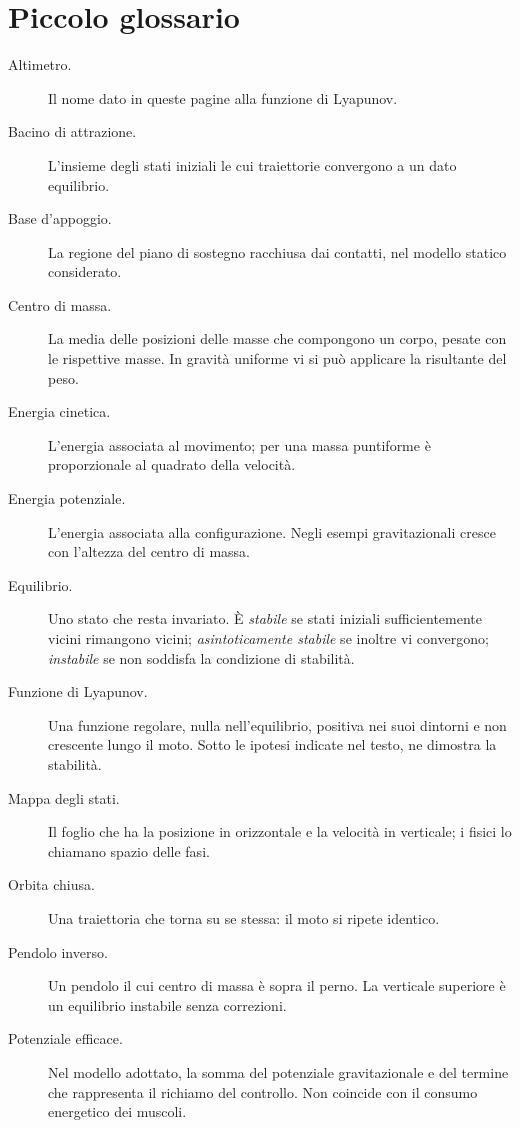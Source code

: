 \documentclass[11pt]{article}
\begin{document}
\section*{Piccolo glossario}

{\small
\begin{description}
\item[Altimetro.] Il nome dato in queste pagine alla funzione di Lyapunov.
\item[Bacino di attrazione.] L'insieme degli stati iniziali le cui traiettorie convergono a un dato equilibrio.
\item[Base d'appoggio.] La regione del piano di sostegno racchiusa dai contatti, nel modello statico considerato.
\item[Centro di massa.] La media delle posizioni delle masse che compongono un corpo, pesate con le rispettive masse. In gravità uniforme vi si può applicare la risultante del peso.
\item[Energia cinetica.] L'energia associata al movimento; per una massa puntiforme è proporzionale al quadrato della velocità.
\item[Energia potenziale.] L'energia associata alla configurazione. Negli esempi gravitazionali cresce con l'altezza del centro di massa.
\item[Equilibrio.] Uno stato che resta invariato. È \emph{stabile} se stati iniziali sufficientemente vicini rimangono vicini; \emph{asintoticamente stabile} se inoltre vi convergono; \emph{instabile} se non soddisfa la condizione di stabilità.
\item[Funzione di Lyapunov.] Una funzione regolare, nulla nell'equilibrio, positiva nei suoi dintorni e non crescente lungo il moto. Sotto le ipotesi indicate nel testo, ne dimostra la stabilità.
\item[Mappa degli stati.] Il foglio che ha la posizione in orizzontale e la velocità in verticale; i fisici lo chiamano spazio delle fasi.
\item[Orbita chiusa.] Una traiettoria che torna su se stessa: il moto si ripete identico.
\item[Pendolo inverso.] Un pendolo il cui centro di massa è sopra il perno. La verticale superiore è un equilibrio instabile senza correzioni.
\item[Potenziale efficace.] Nel modello adottato, la somma del potenziale gravitazionale e del termine che rappresenta il richiamo del controllo. Non coincide con il consumo energetico dei muscoli.

\end{description}}
\end{document}
